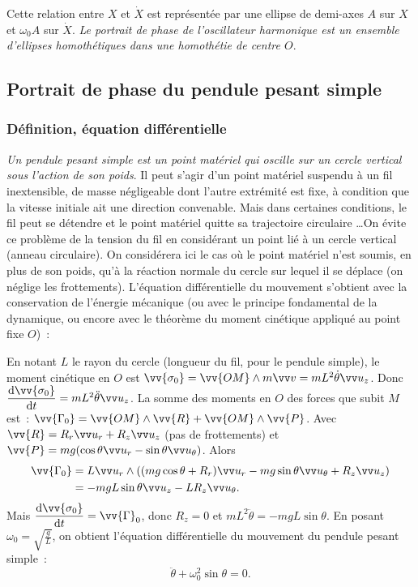 Cette relation entre \(X\) et \(\dot{X}\) est représentée par une ellipse de
demi-axes \(A\) sur \(X\) et \(\omega_0A\) sur \(\dot{X}\). \emph{Le portrait
de phase de l'oscillateur harmonique est un ensemble d'ellipses homothétiques
dans une homothétie de centre \(O\)}.
%
\subsection{Portrait de phase du pendule pesant simple}%
\label{chap5-subsec:portraitdephasepesantsimple}%
%
\subsubsection{Définition, équation différentielle}%
%
\emph{Un pendule pesant simple est un point matériel qui oscille sur un cercle
vertical sous l'action de son poids}. Il peut s'agir d'un point matériel
suspendu à un fil inextensible, de masse négligeable dont l'autre extrémité est
fixe, à condition que la vitesse initiale ait une direction convenable. Mais
dans certaines conditions, le fil peut se détendre et le point matériel quitte
sa trajectoire circulaire \ldots On évite ce problème de la tension du fil en
considérant un point lié à un cercle vertical (anneau circulaire). On
considérera ici le cas où le point matériel n'est soumis, en plus de son poids,
qu'à la réaction normale du cercle sur lequel il se déplace (on néglige les
frottements). L'équation différentielle du mouvement s'obtient avec la
conservation de l'énergie mécanique (ou avec le principe fondamental de la
dynamique, ou encore avec le théorème du moment cinétique appliqué au point
fixe \(O\))~:%

En notant \(L\) le rayon du cercle (longueur du fil, pour le pendule simple),
le moment cinétique en \(O\) est \(\vv{\sigma_0} = \vv{OM}\wedge m \vvv =
mL^2\dot{\theta}\uz\). Donc
\(\derived{\vv{\sigma_0}}{t}=mL^2\ddot{\theta}\uz\). La somme des moments en
\(O\) des forces que subit \(M\) est~:
\(\vv{\Gamma_0}=\vv{OM}\wedge\vv{R}+\vv{OM}\wedge\vv{P}\). Avec \(\vv{R} = R_r
\ur +R_z \uz\) (pas de frottements) et \(\vv{P}=mg(\cos\theta \ur -\sin\theta
\utheta)\). Alors
\begin{align}%
  \vv{\Gamma_0} &= L \ur \wedge \left( (mg\cos\theta +R_r)\ur -
  mg\sin\theta\utheta +R_z\uz\right) \\
  & = -mgL\sin\theta\uz - LR_z\utheta.
\end{align}%
Mais \(\derived{\vv{\sigma_0}}{t} = \vv{\Gamma}_0\), donc \(R_z=0\) et
\(mL^2\ddot{\theta}=-mgL\sin\theta\). En posant \(\omega_0 =
\sqrt{\frac{g}{L}}\), on obtient l'équation différentielle du mouvement du
pendule pesant simple~:
\begin{equation}%
  \ddot{\theta} + \omega_0^2\sin\theta =0.
\end{equation}%
%
